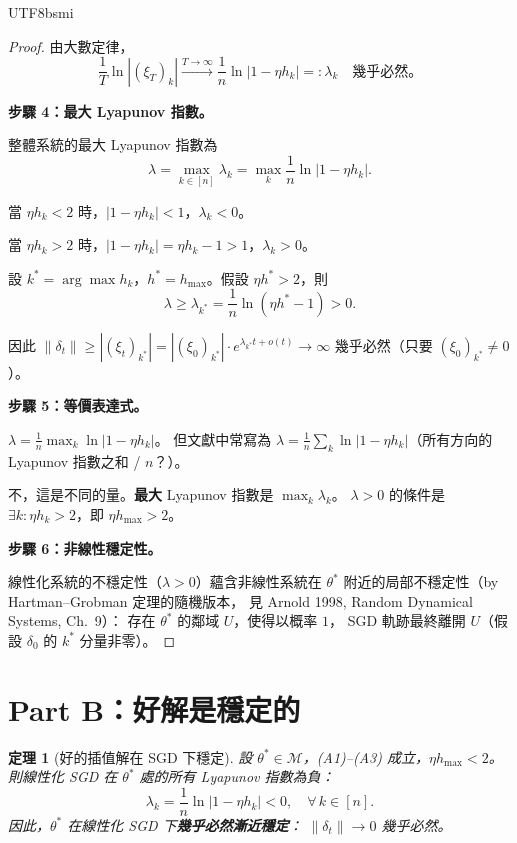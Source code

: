 \documentclass[11pt,a4paper]{article}
\newtheorem{theorem}{定理}
\theoremstyle{definition}
\newcommand{\cM}{\mathcal{M}}
\begin{document}
\begin{CJK}{UTF8}{bsmi}
\begin{proof}
  由大數定律，
  \[
    \frac{1}{T}\ln|(\xi_T)_k|\xrightarrow{T\to\infty}\frac{1}{n}\ln|1-\eta h_k|=:\lambda_k
    \quad\text{幾乎必然。}
  \]

  \textbf{步驟 4：最大 Lyapunov 指數。}

  整體系統的最大 Lyapunov 指數為
  \[
    \lambda=\max_{k\in[n]}\lambda_k=\max_k\frac{1}{n}\ln|1-\eta h_k|.
  \]

  當 $\eta h_k<2$ 時，$|1-\eta h_k|<1$，$\lambda_k<0$。

  當 $\eta h_k>2$ 時，$|1-\eta h_k|=\eta h_k-1>1$，$\lambda_k>0$。

  設 $k^*=\arg\max h_k$，$h^*=h_{\max}$。假設 $\eta h^*>2$，則
  \[
    \lambda\geq\lambda_{k^*}=\frac{1}{n}\ln(\eta h^*-1)>0.
  \]

  因此 $\|\delta_t\|\geq|(\xi_t)_{k^*}|=|(\xi_0)_{k^*}|\cdot e^{\lambda_{k^*}t+o(t)}\to\infty$
  幾乎必然（只要 $(\xi_0)_{k^*}\neq 0$）。

  \textbf{步驟 5：等價表達式。}

  $\lambda=\frac{1}{n}\max_k\ln|1-\eta h_k|$。
  但文獻中常寫為
  $\lambda=\frac{1}{n}\sum_k\ln|1-\eta h_k|$（所有方向的 Lyapunov 指數之和 / $n$？）。

  不，這是不同的量。\textbf{最大} Lyapunov 指數是 $\max_k\lambda_k$。
  $\lambda>0$ 的條件是 $\exists k:\eta h_k>2$，即 $\eta h_{\max}>2$。

  \textbf{步驟 6：非線性穩定性。}

  線性化系統的不穩定性（$\lambda>0$）蘊含非線性系統在 $\theta^*$
  附近的局部不穩定性（by Hartman--Grobman 定理的隨機版本，
  見 Arnold 1998, Random Dynamical Systems, Ch.~9）：
  存在 $\theta^*$ 的鄰域 $U$，使得以概率 $1$，
  SGD 軌跡最終離開 $U$（假設 $\delta_0$ 的 $k^*$ 分量非零）。
\end{proof}

\section{Part B：好解是穩定的}

\begin{theorem}[好的插值解在 SGD 下穩定]\label{thm:B}
  設 $\theta^*\in\cM$，(A1)--(A3) 成立，$\eta h_{\max}<2$。
  則線性化 SGD 在 $\theta^*$ 處的所有 Lyapunov 指數為負：
  \[
    \lambda_k=\frac{1}{n}\ln|1-\eta h_k|<0,\quad\forall\,k\in[n].
  \]
  因此，$\theta^*$ 在線性化 SGD 下\textbf{幾乎必然漸近穩定}：
  $\|\delta_t\|\to 0$ 幾乎必然。


\end{theorem}
\end{CJK}
\end{document}
